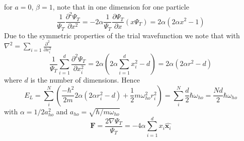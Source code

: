 \documentclass[a4paper, 10pt, english]{revtex4-2} %
\newcommand{\parder}[2]{\frac{\partial #1}{\partial #2}}
\newcommand{\dder}[2]{\frac{\partial^2 #1}{\partial #2^2}}
\begin{document}
    for $a=0$, $\beta = 1$, note that in one dimension for one particle
    \begin{equation}
            \frac{1}{\Psi_T}\dder{\Psi_T}{x}
        =   -2\alpha\frac{1}{\Psi_T}\parder{\Psi_T}{x}\left(x\Psi_T\right)
        =   2\alpha{\left(2\alpha x^2 - 1\right)}
    \end{equation}
    Due to the symmetric properties of the trial wavefunction we note that with $\nabla^2 = \sum_{i=1}\dder{}{x_i}$
    \begin{equation}
            \frac{1}{\Psi_T} \sum_{i=1}^d \dder{\Psi_T}{x_i}
        =   2\alpha\left(2\alpha\sum_{i=1}^dx_i^2 - d\right)
        =   2\alpha\left(2\alpha r^2 - d\right)
    \end{equation}
    where $d$ is the number of dimensions. Hence
    \begin{equation}
            E_L
        =   \sum_i^N\left(\frac{-\hbar^2}{2m}2\alpha\left(2\alpha r_i^2 - d\right) + \frac{1}{2}m\omega_{ho}^2r_i^2\right)
        =   \sum_i^N\frac{d}{2}\hbar\omega_{ho}
        =   \frac{Nd}{2}\hbar\omega_{ho}
    \end{equation}
    with $\alpha = 1/2a_{ho}^2$ and $a_{ho} = \sqrt{\hbar/m\omega_{ho}}$
    \begin{equation}
            \mathbf{F}
        =   \frac{2\nabla \Psi_T}{\Psi_T}
        =   -4\alpha \sum_{i=1}^d x_i \hat{\mathbf{x}_i}
    \end{equation}
\end{document}
